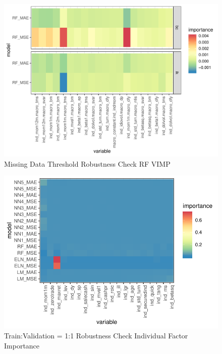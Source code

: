 \documentclass{article}
\begin{document}
\begin{figure}
	\includegraphics[]{../../Results/empirical_missing_threshold/empirical_vimp.pdf}
	\caption{Missing Data Threshold Robustness Check RF VIMP}
\end{figure}





\FloatBarrier


\begin{figure}
	\includegraphics[]{../../Results/empirical_train_valid_1/empirical_all_sample_vi_ind.pdf}
	\caption{{Train:Validation = 1:1 Robustness Check Individual Factor Importance}}
\end{figure}
\end{document}
